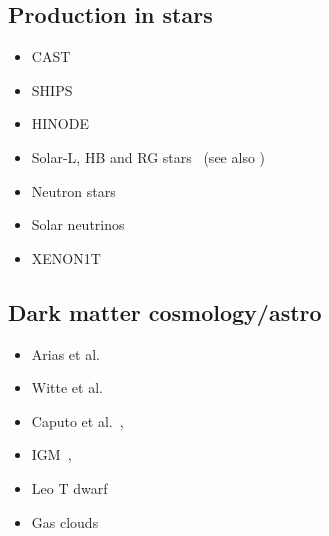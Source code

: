 \documentclass[8pt,twocolumn]{extarticle}
\begin{document}
\begin{mdframed}
\subsection*{Production in stars}\vspace{-0.5em}
\begin{itemize}\setlength\itemsep{-0.5em}
\item CAST~\cite{Redondo:2008aa}
\item SHIPS~\cite{Schwarz:2015lqa} 
\item HINODE~\cite{Frerick:2022mjg}
\item Solar-L, HB and RG stars~\cite{Li:2023vpv} (see also \cite{Redondo:2013lna})
\item Neutron stars~\cite{Hong:2020bxo}
\item Solar neutrinos~\cite{Vinyoles:2015aba}
\item XENON1T~\cite{XENON:2021myl}
\end{itemize}



\subsection*{Dark matter cosmology/astro}\vspace{-0.5em}
\begin{itemize}\setlength\itemsep{-0.5em}
\item  Arias et al.~\cite{Arias:2012az}
\item Witte et al.~\cite{McDermott:2019lch,Witte:2020rvb}
 \item  Caputo et al.~\cite{Caputo:2020rnx,Caputo:2020bdy}, 
 \item  IGM~\cite{Dubovsky:2015cca},
 \item  Leo T dwarf~\cite{Wadekar:2019xnf}
 \item  Gas clouds~\cite{Bhoonah:2019eyo}
\end{itemize}



\end{mdframed}
\end{document}
